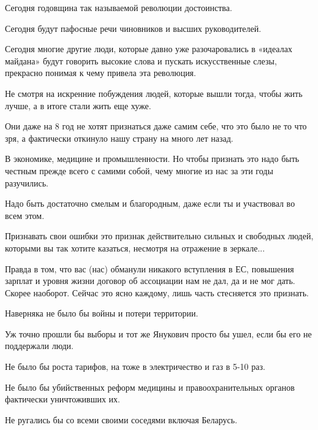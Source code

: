  
 
 
 
 

Сегодня годовщина так называемой революции достоинства.

Сегодня будут пафосные речи чиновников и высших руководителей.

Сегодня многие другие люди, которые давно уже разочаровались в «идеалах
майдана» будут говорить высокие слова и пускать искусственные слезы, прекрасно
понимая к чему привела эта революция.

Не смотря на искренние побуждения людей, которые вышли тогда, чтобы жить лучше,
а в итоге стали жить еще хуже.

Они даже на 8 год не хотят признаться даже самим себе, что это было не то что
зря, а фактически откинуло нашу страну на много лет назад.

В экономике, медицине и промышленности. Но чтобы признать это надо быть честным
прежде всего с самими собой, чему многие из нас за эти годы разучились.

Надо быть достаточно смелым и благородным, даже если ты и участвовал во всем
этом.

Признавать свои ошибки это признак действительно сильных и свободных людей,
которыми вы так хотите казаться, несмотря на отражение в зеркале...

Правда в том, что вас (нас) обманули никакого вступления в ЕС, повышения
зарплат и уровня жизни договор об ассоциации нам не дал, да и не мог дать.
Скорее наоборот. Сейчас это ясно каждому, лишь часть стесняется это признать.

Наверняка не было бы войны и потери территории.

Уж точно прошли бы выборы и тот же Янукович просто бы ушел, если бы его не
поддержали люди.

Не было бы роста тарифов, на тоже в электричество и газ в 5-10 раз.

Не было бы убийственных реформ медицины и правоохранительных органов фактически
уничтоживших их.

Не ругались бы со всеми своими соседями включая Беларусь.

